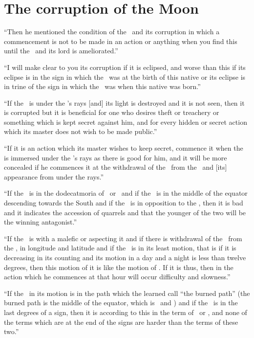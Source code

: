 \section{The corruption of the Moon}
``Then  he mentioned the condition of the \Moon\, and its corruption in which a commencement is not to be made in an action or anything when you find this until the \Moon\, and its lord is ameliorated.''

``I  will make clear to you its corruption if it is eclipsed, and worse than this if its eclipse is in the sign in which the \Moon\, was at the birth of this native or its eclipse is in trine of the sign in which the \Moon\, was when this native was born.''

``If  the \Moon\, is under the \Sun's rays [and] its light is destroyed and it is not seen, then it is corrupted but it is beneficial for one who desires theft or treachery or something which is kept secret against him, and for every hidden or secret action which its master does not wish to be made public.''

``If  it is an action which its master wishes to keep secret, commence it when the \Moon\, is immersed under the \Sun's rays as there is good for him, and it will be more concealed if he commences it at the withdrawal of the \Moon\, from the \Sun\, and [its] appearance from under the rays.''

``If  the \Moon\, is in the dodecatmoria of \Mars\, or \Saturn\, and if the \Moon\, is in the middle of the equator descending towards the South and if the \Moon\, is in opposition to the \Sun, then it is bad and it indicates the accession of quarrels and that the younger of the two will be the winning antagonist.''

``If  the \Moon\, is with a malefic or aspecting it and if there is withdrawal of the \Moon\, from the \Sun, in longitude and latitude and if the \Moon\, is in its least motion, that is if it is decreasing in its counting and its motion in a day and a night is less than twelve degrees, then this motion of it is like the motion of \Saturn. If it is thus, then in the action which he commences at that hour will occur difficulty and slowness.''

``If  the \Moon\, in its motion is in the path which the learned call ``the burned path'' (the burned path is the middle of the equator, which is \Libra\, and \Scorpio) and if the \Moon\, is in the last degrees of a sign, then it is according to this in the term of \Saturn\, or \Mars, and none of the terms which are at the end of the signs are harder than the terms of these two.''

